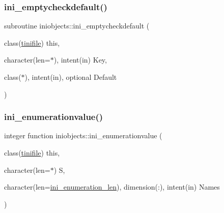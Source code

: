 \mbox{\label{namespaceiniobjects_a872a852d7d01ebf31f03d17592e7fd31}} 
\subsubsection{\texorpdfstring{ini\+\_\+emptycheckdefault()}{ini\_emptycheckdefault()}}
{\footnotesize\ttfamily subroutine iniobjects\+::ini\+\_\+emptycheckdefault (\begin{DoxyParamCaption}\item[{class(\mbox{\hyperlink{structiniobjects_1_1tinifile}{tinifile}})}]{this,  }\item[{character(len=$\ast$), intent(in)}]{Key,  }\item[{class($\ast$), intent(in), optional}]{Default }\end{DoxyParamCaption})\hspace{0.3cm}{\ttfamily [private]}}

\mbox{\label{namespaceiniobjects_a64b8c91a4222e931e13741a44ef55497}} 
\subsubsection{\texorpdfstring{ini\+\_\+enumerationvalue()}{ini\_enumerationvalue()}}
{\footnotesize\ttfamily integer function iniobjects\+::ini\+\_\+enumerationvalue (\begin{DoxyParamCaption}\item[{class(\mbox{\hyperlink{structiniobjects_1_1tinifile}{tinifile}})}]{this,  }\item[{character(len=$\ast$)}]{S,  }\item[{character(len=\mbox{\hyperlink{namespaceiniobjects_ad4e84129fd47c679fb1fcdd444d9fc84}{ini\+\_\+enumeration\+\_\+len}}), dimension(\+:), intent(in)}]{Names }\end{DoxyParamCaption})\hspace{0.3cm}{\ttfamily [private]}}

\mbox{\label{namespaceiniobjects_a3f10c54af4bf829a3e62436354908f1e}} 
